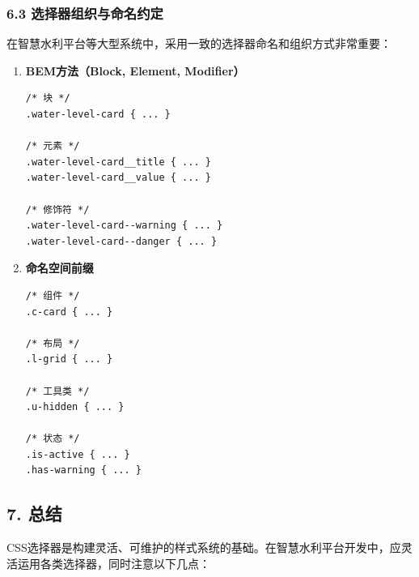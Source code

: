 \subsubsection{6.3
选择器组织与命名约定}\label{ux9009ux62e9ux5668ux7ec4ux7ec7ux4e0eux547dux540dux7ea6ux5b9a}

在智慧水利平台等大型系统中，采用一致的选择器命名和组织方式非常重要：

\begin{enumerate}
\def\labelenumi{\arabic{enumi}.}
\item
  \textbf{BEM方法（Block, Element, Modifier）}

\begin{lstlisting}
/* 块 */
.water-level-card { ... }

/* 元素 */
.water-level-card__title { ... }
.water-level-card__value { ... }

/* 修饰符 */
.water-level-card--warning { ... }
.water-level-card--danger { ... }
\end{lstlisting}
\item
  \textbf{命名空间前缀}

\begin{lstlisting}
/* 组件 */
.c-card { ... }

/* 布局 */
.l-grid { ... }

/* 工具类 */
.u-hidden { ... }

/* 状态 */
.is-active { ... }
.has-warning { ... }
\end{lstlisting}
\end{enumerate}

\subsection{7. 总结}\label{ux603bux7ed3}

CSS选择器是构建灵活、可维护的样式系统的基础。在智慧水利平台开发中，应灵活运用各类选择器，同时注意以下几点：

